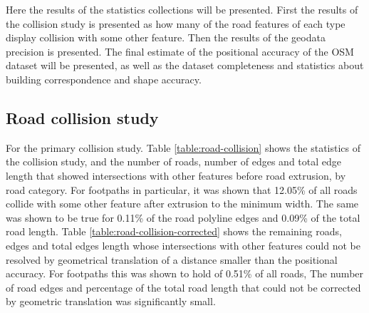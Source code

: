 \documentclass{kththesis}
\begin{document}
Here the results of the statistics collections will be presented.
First the results of the collision study is presented as how many of the road features of each type display collision with some other feature.
Then the results of the geodata precision is presented.
The final estimate of the positional accuracy of the OSM dataset will be presented, as well as the dataset completeness and statistics about building correspondence and shape accuracy.

\subsection{Road collision study}

For the primary collision study.
Table \ref{table:road-collision} shows the statistics of the collision study, and the number of roads, number of edges and total edge length that showed intersections with other features before road extrusion, by road category.
For footpaths in particular, it was shown that 12.05\% of all roads collide with some other feature after extrusion to the minimum width.
The same was shown to be true for 0.11\% of the road polyline edges and 0.09\% of the total road length.
Table \ref{table:road-collision-corrected} shows the remaining roads, edges and total edges length whose intersections with other features could not be resolved by geometrical translation of a distance smaller than the positional accuracy.
For footpaths this was shown to hold of 0.51\% of all roads, 
The number of road edges and percentage of the total road length that could not be corrected by geometric translation was significantly small.
\end{document}
